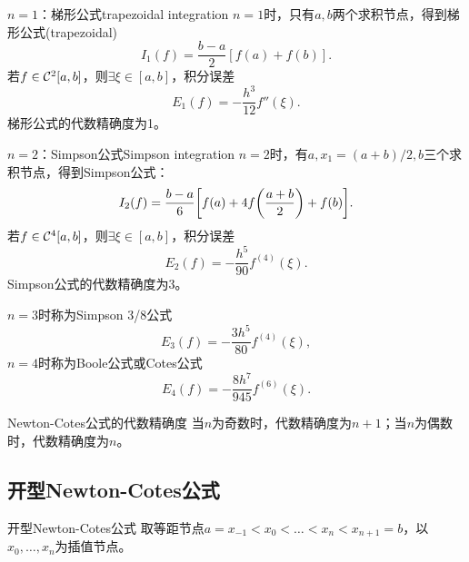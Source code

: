 \begin{example}
    {$n=1$：梯形公式}{trapezoidal integration}
    $n=1$时，只有$a,b$两个求积节点，得到梯形公式(trapezoidal)
    \begin{equation}
        \label{eqn:trapezoidal integration}
        I_1(f)=\frac{b-a}2[f(a)+f(b)].
    \end{equation}
    若$f\in\mathcal C^2[a,b]$，则$\exists\xi\in[a,b]$，积分误差
    \begin{equation}
        \label{eqn:trapezoidal error}
        E_1(f)=-\frac{h^3}{12}f''(\xi).
    \end{equation}
    梯形公式的代数精确度为1。
\end{example}

\begin{example}
    {$n=2$：Simpson公式}{Simpson integration}
    $n=2$时，有$a,x_1=(a+b)/2,b$三个求积节点，得到Simpson公式：
    \begin{equation}
        \label{eqn:Simpson integration}
        I_2(f)=\frac{b-a}6\biggl[f(a)+4f\biggl(\frac{a+b}2\biggr)+f(b)\biggr].
    \end{equation}
    若$f\in\mathcal C^4[a,b]$，则$\exists\xi\in[a,b]$，积分误差
    \begin{equation}
        \label{eqn:Simpson error}
        E_2(f)=-\frac{h^5}{90}f^{(4)}(\xi).
    \end{equation}
    Simpson公式的代数精确度为3。
\end{example}

\begin{remark}
    $n=3$时称为Simpson 3/8公式
    \[
        E_3(f)=-\frac{3h^5}{80}f^{(4)}(\xi),
    \]
    $n=4$时称为Boole公式或Cotes公式
    \[
        E_4(f)=-\frac{8h^7}{945}f^{(6)}(\xi).
    \]
\end{remark}

\begin{theorem}
    {Newton-Cotes公式的代数精确度}{}
    当$n$为奇数时，代数精确度为$n+1$；当$n$为偶数时，代数精确度为$n$。
\end{theorem}

\subsection{开型Newton-Cotes公式}

\begin{theorem}
    {开型Newton-Cotes公式}{}
    取等距节点$a=x_{-1}<x_0<\ldots<x_n<x_{n+1}=b$，以$x_0,\ldots,x_n$为插值节点。
\end{theorem}

